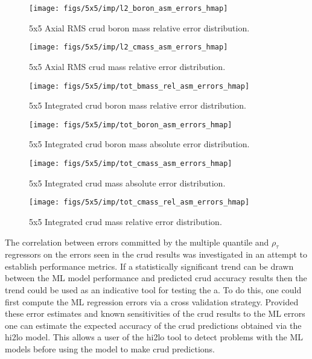 \begin{figure}[H]
    \centering
    \texttt{[image: figs/5x5/imp/l2\_boron\_asm\_errors\_hmap]}
    \caption{5x5 Axial RMS crud boron mass relative error distribution.}
    \label{fig:l2boronasmerrorshmap}
\end{figure}
\begin{figure}[H]
    \centering
    \texttt{[image: figs/5x5/imp/l2\_cmass\_asm\_errors\_hmap]}
    \caption{5x5 Axial RMS crud mass relative error distribution.}
    \label{fig:l2cmassasmerrorshmap}
\end{figure}


\begin{figure}[H]
    \centering
    \texttt{[image: figs/5x5/imp/tot\_bmass\_rel\_asm\_errors\_hmap]}
    \caption{5x5 Integrated crud boron mass relative error distribution.}
    \label{fig:totbmassrelasmerrorshmap}
\end{figure}
\begin{figure}[H]
    \centering
    \texttt{[image: figs/5x5/imp/tot\_boron\_asm\_errors\_hmap]}
    \caption{5x5 Integrated crud boron mass absolute error distribution.}
    \label{fig:totboronasmerrorshmap}
\end{figure}
\begin{figure}[H]
    \centering
    \texttt{[image: figs/5x5/imp/tot\_cmass\_asm\_errors\_hmap]}
    \caption{5x5 Integrated crud mass absolute error distribution.}
    \label{fig:totcmassasmerrorshmap}
\end{figure}
\begin{figure}[H]
    \centering
    \texttt{[image: figs/5x5/imp/tot\_cmass\_rel\_asm\_errors\_hmap]}
    \caption{5x5 Integrated crud mass relative error distribution.}
    \label{fig:totcmassrelasmerrorshmap}
\end{figure}

The correlation between errors committed by the multiple quantile and $\rho_\tau$ regressors on the errors seen in the crud results was investigated in an attempt to establish performance metrics.  If a statistically significant trend can be drawn between the ML model performance and predicted crud accuracy results then the trend could be used as an indicative tool for testing the a.  To do this, one could first compute the ML regression errors via a cross validation strategy.  Provided these error estimates and known sensitivities of the crud results to the ML errors one can estimate the expected accuracy of the crud predictions obtained via the hi2lo model.  This allows a user of the hi2lo tool to detect problems with the ML models before using the model to make crud predictions.

